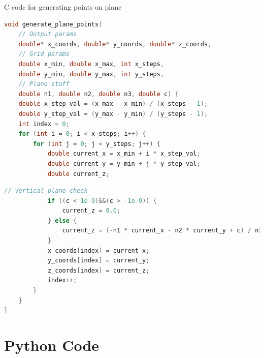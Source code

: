 \documentclass{beamer}
\theoremstyle{remark}
\numberwithin{equation}{section}
\begin{document}
\begin{frame}[fragile]{C code for generating points on plane}
\begin{lstlisting}[language=C]
 void generate_plane_points(
    // Output params
    double* x_coords, double* y_coords, double* z_coords,
    // Grid params
    double x_min, double x_max, int x_steps,
    double y_min, double y_max, int y_steps,
    // Plane stuff
    double n1, double n2, double n3, double c) {
    double x_step_val = (x_max - x_min) / (x_steps - 1);
    double y_step_val = (y_max - y_min) / (y_steps - 1);
    int index = 0;
    for (int i = 0; i < x_steps; i++) {
        for (int j = 0; j < y_steps; j++) {
            double current_x = x_min + i * x_step_val;
            double current_y = y_min + j * y_step_val;
            double current_z;
\end{lstlisting}
\end{frame}
\begin{frame}[fragile]
 \begin{lstlisting}[language=C]
            // Vertical plane check
            if ((c < 1e-9)&&(c > -1e-9)) {
                current_z = 0.0;
            } else {
                current_z = (-n1 * current_x - n2 * current_y + c) / n3;
            }
            x_coords[index] = current_x;
            y_coords[index] = current_y;
            z_coords[index] = current_z;
            index++;
        }
    }
}
 \end{lstlisting}
\end{frame}

\section{Python Code}
\end{document}
